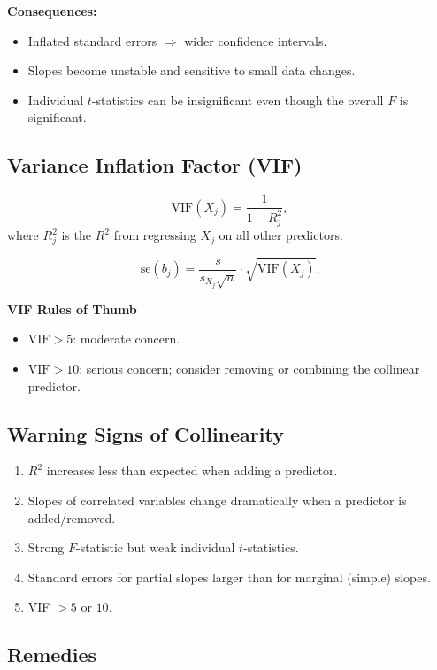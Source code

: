 \documentclass[12pt, a4paper]{article}
\begin{document}
\textbf{Consequences:}
\begin{itemize}
  \item Inflated standard errors $\Rightarrow$ wider confidence intervals.
  \item Slopes become unstable and sensitive to small data changes.
  \item Individual $t$-statistics can be insignificant even though the overall $F$ is significant.
\end{itemize}

\subsection{Variance Inflation Factor (VIF)}

\[
  \text{VIF}(X_j) = \frac{1}{1 - R_j^2},
\]
where $R_j^2$ is the $R^2$ from regressing $X_j$ on all other predictors.

\[
  \text{se}(b_j) = \frac{s}{s_{X_j}\sqrt{n}} \cdot \sqrt{\text{VIF}(X_j)}.
\]

\begin{keybox}
\noindent\textbf{VIF Rules of Thumb}\par\smallskip
\begin{itemize}
  \item $\text{VIF} > 5$: moderate concern.
  \item $\text{VIF} > 10$: serious concern; consider removing or combining the collinear predictor.
\end{itemize}
\end{keybox}

\subsection{Warning Signs of Collinearity}

\begin{enumerate}
  \item $R^2$ increases less than expected when adding a predictor.
  \item Slopes of correlated variables change dramatically when a predictor is added/removed.
  \item Strong $F$-statistic but weak individual $t$-statistics.
  \item Standard errors for partial slopes larger than for marginal (simple) slopes.
  \item VIF $> 5$ or $10$.
\end{enumerate}

\subsection{Remedies}
\end{document}
